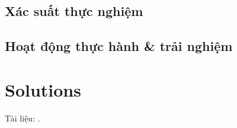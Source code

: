 \documentclass{article}
\numberwithin{equation}{section}
\begin{document}
\subsection{Xác suất thực nghiệm}

\subsection{Hoạt động thực hành \& trải nghiệm}


\section{Solutions}

\newpage
Tài liệu: \cite{SGK_Toan_6_Canh_Dieu_tap_1, SGK_Toan_6_Canh_Dieu_tap_2, SBT_Toan_6_Canh_Dieu_tap_1, Binh_Toan_6_tap_1, Binh_Toan_6_tap_2, Trong_Toan_6_2021}.

\printbibliography[heading=bibintoc]
	
\end{document}
